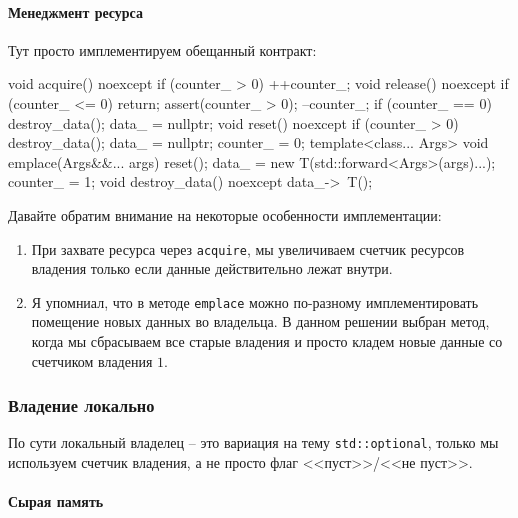 \paragraph{Менеджмент ресурса}

Тут просто имплементируем обещанный контракт:
\begin{cppcode}
void acquire() noexcept {
  if (counter_ > 0)
    ++counter_;
}
void release() noexcept {
  if (counter_ <= 0)
    return;
  assert(counter_ > 0);
  --counter_;
  if (counter_ == 0) {
    destroy_data();
    data_ = nullptr;
  }
}
void reset() noexcept {
  if (counter_ > 0) {
    destroy_data();
    data_ = nullptr;
    counter_ = 0;
  }
}
template<class... Args>
void emplace(Args&&... args) {
  reset();
  data_ = new T(std::forward<Args>(args)...);
  counter_ = 1;
}
void destroy_data() noexcept {
  data_->~T();
}
\end{cppcode}
Давайте обратим внимание на некоторые особенности имплементации:
\begin{enumerate}
\item При захвате ресурса через \verb"acquire", мы увеличиваем счетчик ресурсов владения только если данные действительно лежат внутри.

\item Я упомниал, что в методе \verb"emplace" можно по-разному имплементировать помещение новых данных во владельца.
В данном решении выбран метод, когда мы сбрасываем все старые владения и просто кладем новые данные со счетчиком владения $1$.
\end{enumerate}

\subsubsection{Владение локально}

По сути локальный владелец -- это вариация на тему \verb"std::optional", только мы используем счетчик владения, а не просто флаг <<пуст>>/<<не пуст>>.

\paragraph{Сырая память}

